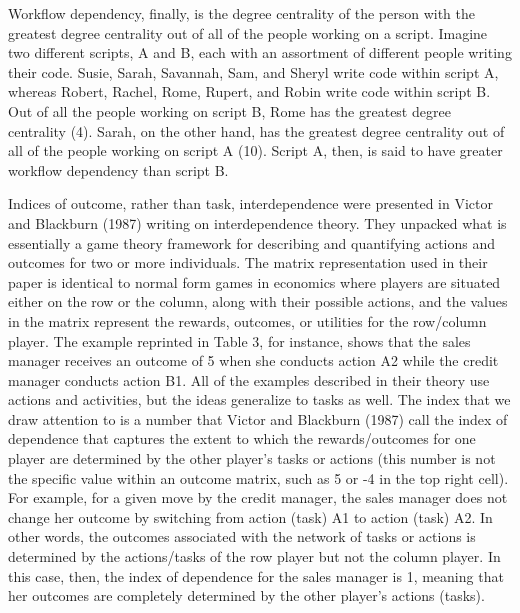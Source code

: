 \documentclass[english,,man]{apa6}
\theoremstyle{definition}
\theoremstyle{definition}
\theoremstyle{definition}
\theoremstyle{remark}
\begin{document}
Workflow dependency, finally, is the degree centrality of the person
with the greatest degree centrality out of all of the people working on
a script. Imagine two different scripts, A and B, each with an
assortment of different people writing their code. Susie, Sarah,
Savannah, Sam, and Sheryl write code within script A, whereas Robert,
Rachel, Rome, Rupert, and Robin write code within script B. Out of all
the people working on script B, Rome has the greatest degree centrality
(4). Sarah, on the other hand, has the greatest degree centrality out of
all of the people working on script A (10). Script A, then, is said to
have greater workflow dependency than script B.

Indices of outcome, rather than task, interdependence were presented in
Victor and Blackburn (1987) writing on interdependence theory. They
unpacked what is essentially a game theory framework for describing and
quantifying actions and outcomes for two or more individuals. The matrix
representation used in their paper is identical to normal form games in
economics where players are situated either on the row or the column,
along with their possible actions, and the values in the matrix
represent the rewards, outcomes, or utilities for the row/column player.
The example reprinted in Table 3, for instance, shows that the sales
manager receives an outcome of 5 when she conducts action A2 while the
credit manager conducts action B1. All of the examples described in
their theory use actions and activities, but the ideas generalize to
tasks as well. The index that we draw attention to is a number that
Victor and Blackburn (1987) call the index of dependence that captures
the extent to which the rewards/outcomes for one player are determined
by the other player's tasks or actions (this number is not the specific
value within an outcome matrix, such as 5 or -4 in the top right cell).
For example, for a given move by the credit manager, the sales manager
does not change her outcome by switching from action (task) A1 to action
(task) A2. In other words, the outcomes associated with the network of
tasks or actions is determined by the actions/tasks of the row player
but not the column player. In this case, then, the index of dependence
for the sales manager is 1, meaning that her outcomes are completely
determined by the other player's actions (tasks).
\end{document}
